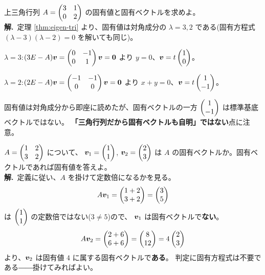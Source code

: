 \begin{rei}[例題・基本(三角行列)]\label{rei:eigen-tri}
上三角行列 $A = \begin{pmatrix}3 & 1 \\ 0 & 2\end{pmatrix}$ の固有値と固有ベクトルを求めよ。\\
\textbf{解.}\ 定理 \ref{thm:eigen-tri} より、固有値は対角成分の
$\lambda = 3, 2$ である(固有方程式
$(\lambda - 3)(\lambda - 2) = 0$ を解いても同じ)。

$\lambda = 3$:$(3E - A)\bm{v} = \begin{pmatrix}0 & -1 \\ 0 & 1\end{pmatrix}\bm{v} = \bm{0}$
より $y = 0$、$\bm{v} = t\begin{pmatrix}1 \\ 0\end{pmatrix}$。

$\lambda = 2$:$(2E - A)\bm{v} = \begin{pmatrix}-1 & -1 \\ 0 & 0\end{pmatrix}\bm{v} = \bm{0}$
より $x + y = 0$、$\bm{v} = t\begin{pmatrix}1 \\ -1\end{pmatrix}$。

固有値は対角成分から即座に読めたが、固有ベクトルの一方
$\begin{pmatrix}1 \\ -1\end{pmatrix}$ は標準基底ベクトルではない。
\textbf{「三角行列だから固有ベクトルも自明」ではない}点に注意。
\end{rei}

\begin{rei}[例題・基本(固有ベクトルかどうかの判定)]\label{rei:eigen-check}
$A = \begin{pmatrix}1 & 2 \\ 3 & 2\end{pmatrix}$ について、
$\bm{v}_1 = \begin{pmatrix}1 \\ 1\end{pmatrix}$, $\bm{v}_2 = \begin{pmatrix}2 \\ 3\end{pmatrix}$ は
$A$ の固有ベクトルか。固有ベクトルであれば固有値を答えよ。\\
\textbf{解.}\ 定義に従い、$A$ を掛けて定数倍になるかを見る。
\[
A\bm{v}_1 = \begin{pmatrix}1 + 2 \\ 3 + 2\end{pmatrix} = \begin{pmatrix}3 \\ 5\end{pmatrix}
\]
は $\begin{pmatrix}1 \\ 1\end{pmatrix}$ の定数倍ではない($3 \neq 5$)ので、
$\bm{v}_1$ は固有ベクトルで\textbf{ない}。
\[
A\bm{v}_2 = \begin{pmatrix}2 + 6 \\ 6 + 6\end{pmatrix} = \begin{pmatrix}8 \\ 12\end{pmatrix} = 4\begin{pmatrix}2 \\ 3\end{pmatrix}
\]
より、$\bm{v}_2$ は固有値 $4$ に属する固有ベクトルで\textbf{ある}。
判定に固有方程式は不要である――掛けてみればよい。
\end{rei}

